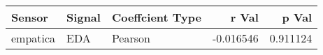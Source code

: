 \begin{tabular}{lllrr}
\toprule
  Sensor & Signal & Coeffcient Type &     r Val &    p Val \\
\midrule
empatica &    EDA &         Pearson & -0.016546 & 0.911124 \\
\bottomrule
\end{tabular}
